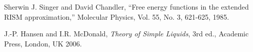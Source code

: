 \documentclass[12pt]{article}
\begin{document}
\begin{thebibliography}{100}

  Sherwin J. Singer and David Chandler,
  ``Free energy functions in the extended RISM approximation,''
  Molecular Physics, Vol. 55, No. 3, 621-625,
  1985.

  J.-P. Hansen and I.R. McDonald,
  {\it Theory of Simple Liquids}, 3rd ed.,
  Academic Press, London, UK 2006.

\end{thebibliography}
\end{document}
